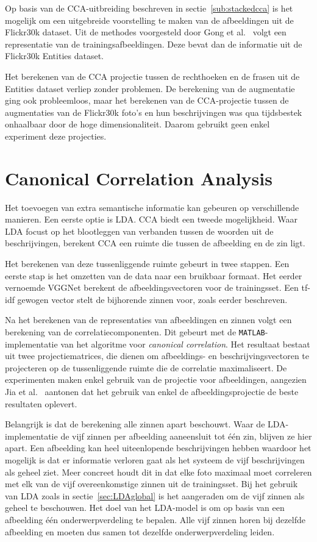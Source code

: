 Op basis van de CCA-uitbreiding beschreven in sectie~\ref{sub:stackedcca} is het mogelijk om een uitgebreide voorstelling te maken van de afbeeldingen uit de Flickr30k dataset. Uit de methodes voorgesteld door Gong et al.~\cite{Gong2014} volgt een representatie van de trainingsafbeeldingen. Deze bevat dan de informatie uit de Flickr30k Entities dataset.

Het berekenen van de CCA projectie tussen de rechthoeken en de frasen uit de Entities dataset verliep zonder problemen. De berekening van de augmentatie ging ook probleemloos, maar het berekenen van de CCA-projectie tussen de augmentaties van de Flickr30k foto's en hun beschrijvingen was qua tijdsbestek onhaalbaar door de hoge dimensionaliteit. Daarom gebruikt geen enkel experiment deze projecties. 

\section{Canonical Correlation Analysis}
Het toevoegen van extra semantische informatie kan gebeuren op verschillende manieren. Een eerste optie is LDA. CCA biedt een tweede mogelijkheid. Waar LDA focust op het blootleggen van verbanden tussen de woorden uit de beschrijvingen, berekent CCA een ruimte die tussen de afbeelding en de zin ligt.

Het berekenen van deze tussenliggende ruimte gebeurt in twee stappen. Een eerste stap is het omzetten van de data naar een bruikbaar formaat. Het eerder vernoemde VGGNet berekent de afbeeldingsvectoren voor de trainingsset. Een tf-idf gewogen vector stelt de bijhorende zinnen voor, zoals eerder beschreven. 

Na het berekenen van de representaties van afbeeldingen en zinnen volgt een berekening van de correlatiecomponenten. Dit gebeurt met de \texttt{MATLAB}-implementatie van het algoritme voor \emph{canonical correlation}. Het resultaat bestaat uit twee projectiematrices, die dienen om afbeeldings- en beschrijvingsvectoren te projecteren op de tussenliggende ruimte die de correlatie maximaliseert. De experimenten maken enkel gebruik van de projectie voor afbeeldingen, aangezien Jia et al.~\cite{Fernando2015} aantonen dat het gebruik van enkel de afbeeldingsprojectie de beste resultaten oplevert.

Belangrijk is dat de berekening alle zinnen apart beschouwt. Waar de LDA-implementatie de vijf zinnen per afbeelding aaneensluit tot \'e\'en zin, blijven ze hier apart. Een afbeelding kan heel uiteenlopende beschrijvingen hebben waardoor het mogelijk is dat er informatie verloren gaat als het systeem de vijf beschrijvingen als geheel ziet. Meer concreet houdt dit in dat elke foto maximaal moet correleren met elk van de vijf overeenkomstige zinnen uit de trainingsset. Bij het gebruik van LDA zoals in sectie~\ref{sec:LDAglobal} is het aangeraden om de vijf zinnen als geheel te beschouwen. Het doel van het LDA-model is om op basis van een afbeelding \'e\'en onderwerpverdeling te bepalen. Alle vijf zinnen horen bij dezelfde afbeelding en moeten dus samen tot dezelfde onderwerpverdeling leiden.

